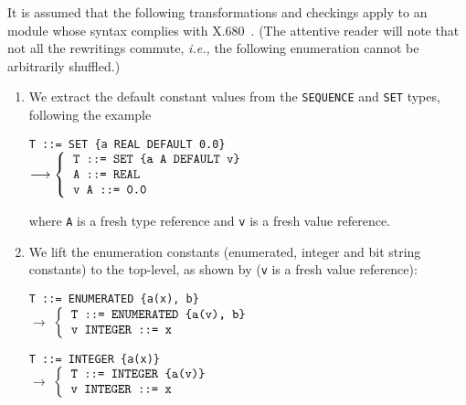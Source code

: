 It is assumed that the following transformations and checkings apply
to an \ASN module whose syntax complies with
\mbox{X.680}~\cite{X.680:2002}. (The attentive reader will note that
not all the rewritings commute, \emph{i.e.,} the following enumeration
cannot be arbitrarily shuffled.)
\begin{enumerate}

  \item \label{default_values} We extract the default constant values
    from the \texttt{\small SEQUENCE} and \texttt{\small SET} types,
    following the example

        {\small
         \verb+T ::= SET {a REAL DEFAULT 0.0}+\\
         $\longrightarrow
         \left\{
                \begin{tabular}{l}
                  \verb+T ::= SET {a A DEFAULT v}+\\
                  \verb+A ::= REAL+\\
                  \verb+v A ::= 0.0+
                \end{tabular}
              \right.$
        }

        where \texttt{A} is a fresh type reference and \texttt{v} is
        a fresh value reference.

  \item \label{constants}
        We lift the enumeration constants (enumerated, integer and bit
        string constants) to the top-level, as shown by
        (\texttt{v} is a fresh value reference):

        {\small
           \verb+T ::= ENUMERATED {a(x), b}+\\
            $\longrightarrow$
            $\left\{
                \begin{tabular}{l}
                  \verb+T ::= ENUMERATED {a(v), b}+\\
                  \verb+v INTEGER ::= x+
                \end{tabular}
              \right.$

           \verb+T ::= INTEGER {a(x)}+\\
            $\longrightarrow$
            $\left\{
                \begin{tabular}{l}
                   \verb+T ::= INTEGER {a(v)}+\\
                   \verb+v INTEGER ::= x+
                \end{tabular}
              \right.$

}
\end{enumerate}

